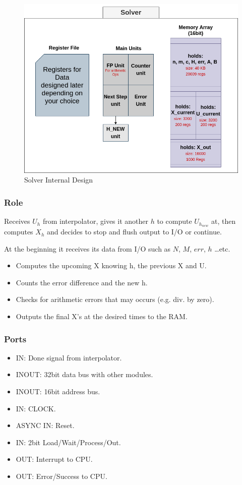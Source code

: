 \documentclass[12pt]{report}
\begin{document}
\begin{figure}[hp]
    \centering
    \includegraphics[width=\textwidth]{images/solver}
    \caption{Solver Internal Design}
    \label{fig:solver}
\end{figure}


\subsubsection{Role}
Receives $U_h$ from interpolator, gives it another $h$ to compute $U_{h_{new}}$ at, then computes $X_h$ and decides to stop and flush output to I/O or continue.

At the beginning it receives its data from I/O such as $N$, $M$, $err$, $h$ \dots etc.

\begin{itemize}
    \item Computes the upcoming X knowing h, the previous X and U.
    \item Counts the error difference and the new h.
    \item Checks for arithmetic errors that may occurs (e.g. div. by zero).
    \item Outputs the final X's at the desired times to the RAM.
\end{itemize}

\subsubsection{Ports}
\begin{itemize}
    \item IN: Done signal from interpolator.
    \item INOUT: 32bit data bus with other modules.
    \item INOUT: 16bit address bus.
    \item IN: CLOCK.
    \item ASYNC IN: Reset.
    \item IN: 2bit Load/Wait/Process/Out.
    \item OUT: Interrupt to CPU.
    \item OUT: Error/Success to CPU.
\end{itemize}
\end{document}
